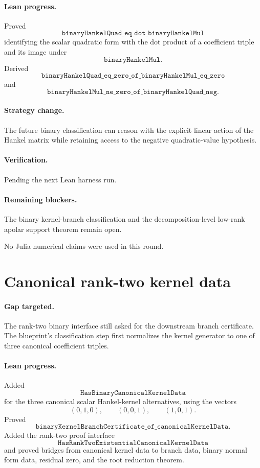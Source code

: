 \documentclass[11pt]{article}
\begin{document}
\paragraph{Lean progress.}
Proved
\[
\texttt{binaryHankelQuad\_eq\_dot\_binaryHankelMul}
\]
identifying the scalar quadratic form with the dot product of a coefficient
triple and its image under
\[
\texttt{binaryHankelMul}.
\]
Derived
\[
\texttt{binaryHankelQuad\_eq\_zero\_of\_binaryHankelMul\_eq\_zero}
\]
and
\[
\texttt{binaryHankelMul\_ne\_zero\_of\_binaryHankelQuad\_neg}.
\]

\paragraph{Strategy change.}
The future binary classification can reason with the explicit linear action of
the Hankel matrix while retaining access to the negative quadratic-value
hypothesis.

\paragraph{Verification.}
Pending the next Lean harness run.

\paragraph{Remaining blockers.}
The binary kernel-branch classification and the decomposition-level low-rank
apolar support theorem remain open.

No Julia numerical claims were used in this round.

\section*{Canonical rank-two kernel data}

\paragraph{Gap targeted.}
The rank-two binary interface still asked for the downstream branch
certificate.  The blueprint's classification step first normalizes the kernel
generator to one of three canonical coefficient triples.

\paragraph{Lean progress.}
Added
\[
\texttt{HasBinaryCanonicalKernelData}
\]
for the three canonical scalar Hankel-kernel alternatives, using the vectors
\[
(0,1,0),\qquad (0,0,1),\qquad (1,0,1).
\]
Proved
\[
\texttt{binaryKernelBranchCertificate\_of\_canonicalKernelData}.
\]
Added the rank-two proof interface
\[
\texttt{HasRankTwoExistentialCanonicalKernelData}
\]
and proved bridges from canonical kernel data to branch data, binary normal
form data, residual zero, and the root reduction theorem.
\end{document}
